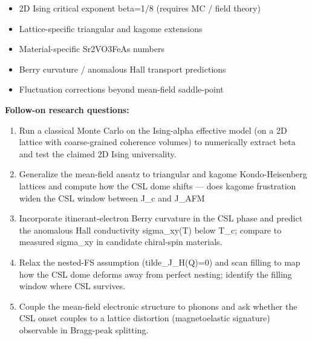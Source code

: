 \documentclass[11pt]{article}
\begin{document}
\begin{itemize}[leftmargin=1.4em,itemsep=0.2em,topsep=0.2em]
\item 2D Ising critical exponent beta=1/8 (requires MC / field theory)
\item Lattice-specific triangular and kagome extensions
\item Material-specific Sr2VO3FeAs numbers
\item Berry curvature / anomalous Hall transport predictions
\item Fluctuation corrections beyond mean-field saddle-point
\end{itemize}\noindent\textbf{Follow-on research questions:}
\begin{enumerate}[leftmargin=1.6em,itemsep=0.2em,topsep=0.2em,label=Q\arabic*.]
\item Run a classical Monte Carlo on the Ising-alpha effective model (on a 2D lattice with coarse-grained coherence volumes) to numerically extract beta and test the claimed 2D Ising universality.
\item Generalize the mean-field ansatz to triangular and kagome Kondo-Heisenberg lattices and compute how the CSL dome shifts --- does kagome frustration widen the CSL window between J\_c and J\_AFM
\item Incorporate itinerant-electron Berry curvature in the CSL phase and predict the anomalous Hall conductivity sigma\_xy(T) below T\_c; compare to measured sigma\_xy in candidate chiral-spin materials.
\item Relax the nested-FS assumption (tilde\_J\_H(Q)=0) and scan filling to map how the CSL dome deforms away from perfect nesting; identify the filling window where CSL survives.
\item Couple the mean-field electronic structure to phonons and ask whether the CSL onset couples to a lattice distortion (magnetoelastic signature) observable in Bragg-peak splitting.
\end{enumerate}
\end{document}
